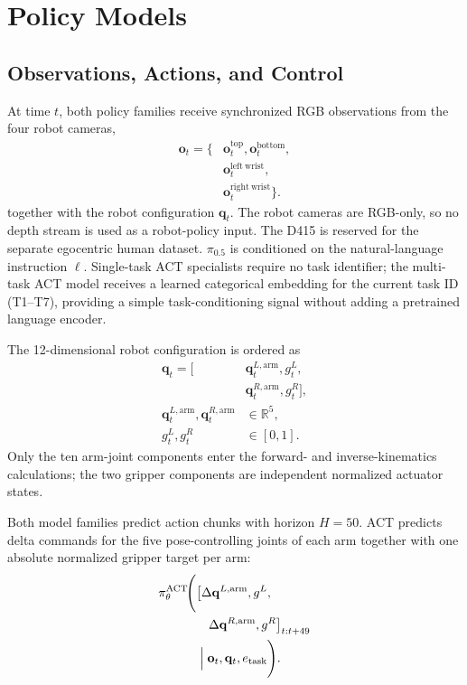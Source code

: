 \documentclass[10pt,conference]{IEEEtran}
\begin{document}
\section{Policy Models}
\label{sec:models}

\subsection{Observations, Actions, and Control}

At time \(t\), both policy families receive synchronized RGB observations from
the four robot cameras,
\begin{equation*}
\begin{aligned}
\mathbf{o}_t = \bigl\{&
\mathbf{o}^{\mathrm{top}}_t,
\mathbf{o}^{\mathrm{bottom}}_t,
\\
&\mathbf{o}^{\mathrm{left\ wrist}}_t,
\\
&\mathbf{o}^{\mathrm{right\ wrist}}_t
\bigr\}.
\end{aligned}
\end{equation*}
together with the robot configuration \(\mathbf{q}_t\). The robot cameras are
RGB-only, so no depth stream is used as a robot-policy input. The D415 is
reserved for the separate egocentric human dataset. $\pi_{0.5}$ is conditioned
on the natural-language instruction \(\ell\). Single-task ACT specialists require no
task identifier; the multi-task ACT model receives a learned categorical
embedding for the current task ID (T1--T7), providing a simple
task-conditioning signal without adding a pretrained language encoder.

The 12-dimensional robot configuration is ordered as
\begin{equation*}
\begin{aligned}
\mathbf{q}_t = \bigl[&
\mathbf{q}^{L,\mathrm{arm}}_t,
g^L_t,
\\
&\mathbf{q}^{R,\mathrm{arm}}_t,
g^R_t
\bigr],
\\
\mathbf{q}^{L,\mathrm{arm}}_t,
\mathbf{q}^{R,\mathrm{arm}}_t
&\in \mathbb{R}^{5},
\\
g^L_t,g^R_t &\in [0,1].
\end{aligned}
\end{equation*}
Only the ten arm-joint components enter the forward- and inverse-kinematics
calculations; the two gripper components are independent normalized actuator
states.

Both model families predict action chunks with horizon \(H=50\). ACT predicts
delta commands for the five pose-controlling joints of each arm together with
one absolute normalized gripper target per arm:
\begin{equation}
\begin{aligned}
    \pi^{\mathrm{ACT}}_\theta\!\Biggl(
    &\bigl[
    \Delta\mathbf{q}^{L,\mathrm{arm}},g^L,
    \\
    &\quad \Delta\mathbf{q}^{R,\mathrm{arm}},g^R
    \bigr]_{t:t+49}
    \\
    &\Bigm|
    \mathbf{o}_t,\mathbf{q}_t,e_{\mathrm{task}}
    \Biggr).
\end{aligned}
\end{equation}
\end{document}
